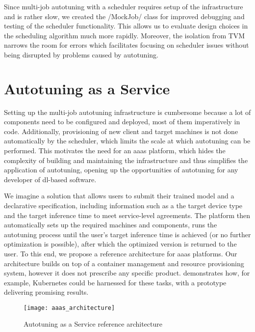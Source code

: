 Since multi-job autotuning with a scheduler requires setup of the infrastructure and is rather slow, we created the \pythoninline/MockJob/ class for improved debugging and testing of the scheduler functionality. This allows us to evaluate design choices in the scheduling algorithm much more rapidly. Moreover, the isolation from TVM narrows the room for errors which facilitates focusing on scheduler issues without being disrupted by problems caused by autotuning.

\section{Autotuning as a Service}
Setting up the multi-job autotuning infrastructure is cumbersome because a lot of components need to be configured and deployed, most of them imperatively in code. Additionally, provisioning of new client and target machines is not done automatically by the scheduler, which limits the scale at which autotuning can be performed. This motivates the need for an \gls{aaas} platform, which hides the complexity of building and maintaining the infrastructure and thus simplifies the application of autotuning, opening up the opportunities of autotuning for any developer of \gls{dl}-based software.

We imagine a solution that allows users to submit their trained model and a declarative specification, including information such as a the target device type and the target inference time to meet service-level agreements. The platform then automatically sets up the required machines and components, runs the autotuning process until the user's target inference time is achieved (or no further optimization is possible), after which the optimized version is returned to the user. To this end, we propose a reference architecture for \gls{aaas} platforms. Our architecture builds on top of a container management and resource provisioning system, however it does not prescribe any specific product. \cite{Cho.2019} demonstrates how, for example, Kubernetes could be harnessed for these tasks, with a prototype delivering promising results. 

\begin{figure}[t]
	\centering
	\texttt{[image: aaas\_architecture]}%
	\caption{Autotuning as a Service reference architecture}
	\label{fig:aaas-architecture}
\end{figure}


